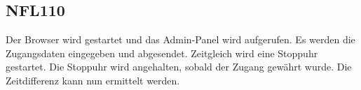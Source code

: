 \subsection*{NFL110}

Der \Gls{Browser} wird gestartet und das \Gls{Admin-Panel} wird aufgerufen.
Es werden die \Gls{Zugangsdaten} eingegeben und abgesendet. Zeitgleich wird eine Stoppuhr gestartet.
Die Stoppuhr wird angehalten, sobald der Zugang gewährt wurde.
Die Zeitdifferenz kann nun ermittelt werden.
